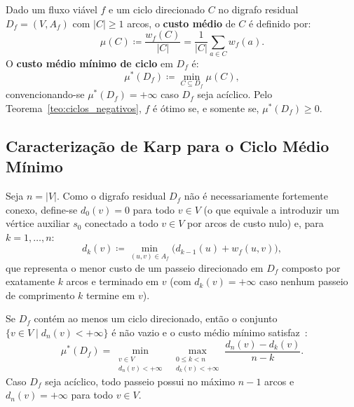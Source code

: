 \begin{definicao}
Dado um fluxo viável $f$ e um ciclo direcionado $C$ no digrafo residual $D_f = (V, A_f)$ com $|C| \ge 1$ arcos, o \textbf{custo médio} de $C$ é definido por:
\begin{equation}
    \mu(C) \coloneqq \frac{w_f(C)}{|C|} = \frac{1}{|C|} \sum_{a \in C} w_f(a).
\end{equation}
O \textbf{custo médio mínimo de ciclo} em $D_f$ é:
\begin{equation}
    \mu^*(D_f) \coloneqq \min_{C \subseteq D_f} \mu(C),
\end{equation}
convencionando-se $\mu^*(D_f) = +\infty$ caso $D_f$ seja acíclico. Pelo Teorema~\ref{teo:ciclos_negativos}, $f$ é ótimo se, e somente se, $\mu^*(D_f) \ge 0$.
\end{definicao}


\subsection{Caracterização de Karp para o Ciclo Médio Mínimo}

Seja $n = |V|$. Como o digrafo residual $D_f$ não é necessariamente fortemente conexo, define-se $d_0(v) = 0$ para todo $v \in V$ (o que equivale a introduzir um vértice auxiliar $s_0$ conectado a todo $v \in V$ por arcos de custo nulo) e, para $k = 1, \dots, n$:
\begin{equation}
    d_k(v) \coloneqq \min_{(u,v) \in A_f} \bigl(d_{k-1}(u) + w_f(u,v)\bigr),
\end{equation}
que representa o menor custo de um passeio direcionado em $D_f$ composto por exatamente $k$ arcos e terminado em $v$ (com $d_k(v) = +\infty$ caso nenhum passeio de comprimento $k$ termine em $v$).

\begin{teorema}
Se $D_f$ contém ao menos um ciclo direcionado, então o conjunto $\{v \in V \mid d_n(v) < +\infty\}$ é não vazio e o custo médio mínimo satisfaz~\cite{karp1978characterization}:
\begin{equation}\label{eq:karp}
    \mu^*(D_f) = \min_{\substack{v \in V \\ d_n(v) < +\infty}} \; \max_{\substack{0 \le k < n \\ d_k(v) < +\infty}} \frac{d_n(v) - d_k(v)}{n - k}.
\end{equation}
Caso $D_f$ seja acíclico, todo passeio possui no máximo $n - 1$ arcos e $d_n(v) = +\infty$ para todo $v \in V$.
\end{teorema}

